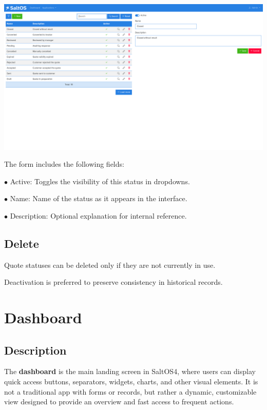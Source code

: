 \documentclass[a4paper]{article}
\begin{document}
\begin{center}\includegraphics[width=1\textwidth]{../ujest/snaps/test-screenshots-js-screenshots-crm-quotes-status-edit-10-en-us-1-snap.png}\end{center}

The form includes the following fields:

\begin{compactitem}
\item[\color{myblue}$\bullet$] Active: Toggles the visibility of this status in dropdowns.
\item[\color{myblue}$\bullet$] Name: Name of the status as it appears in the interface.
\item[\color{myblue}$\bullet$] Description: Optional explanation for internal reference.
\end{compactitem}

\hypertarget{toc80}{}
\subsection{Delete}

Quote statuses can be deleted only if they are not currently in use.

Deactivation is preferred to preserve consistency in historical records.


\hypertarget{toc81}{}
\section{Dashboard}

\hypertarget{toc82}{}
\subsection{Description}

The \textbf{dashboard} is the main landing screen in SaltOS4, where users can display quick access buttons, separators, widgets, charts, and other visual elements.
It is not a traditional app with forms or records, but rather a dynamic, customizable view designed to provide an overview and fast access to frequent actions.
\end{document}
